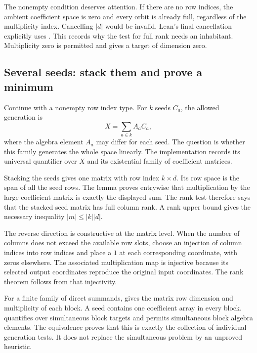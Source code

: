 
The nonempty condition deserves attention. If there are no row indices, the ambient coefficient space is zero and every orbit is already full, regardless of the multiplicity index. Cancelling $|d|$ would be invalid. Lean's final cancellation explicitly uses . This records why the test for full rank needs an inhabitant. Multiplicity zero is permitted and gives a target of dimension zero.

\subsection{Several seeds: stack them and prove a minimum}
Continue with a nonempty row index type. For $k$ seeds $C_a$, the allowed generation is
\[
X=\sum_{a\in k}A_aC_a,
\]
where the algebra element $A_a$ may differ for each seed. The question is whether this family generates the whole space linearly. The implementation records its universal quantifier over $X$ and its existential family of coefficient matrices.


Stacking the seeds gives one matrix with row index $k\times d$. Its row space is the span of all the seed rows. The lemma  proves entrywise that multiplication by the large coefficient matrix is exactly the displayed sum. The rank test therefore says that the stacked seed matrix has full column rank. A rank upper bound gives the necessary inequality $|m|\le |k||d|$.

The reverse direction is constructive at the matrix level. When the number of columns does not exceed the available row slots, choose an injection of column indices into row indices and place a $1$ at each corresponding coordinate, with zeros elsewhere. The associated multiplication map is injective because its selected output coordinates reproduce the original input coordinates. The rank theorem follows from that injectivity.


For a finite family of direct summands,  gives the matrix row dimension and multiplicity of each block. A seed contains one coefficient array in every block.  quantifies over simultaneous block targets and permits simultaneous block algebra elements. The equivalence  proves that this is exactly the collection of individual generation tests. It does not replace the simultaneous problem by an unproved heuristic.

